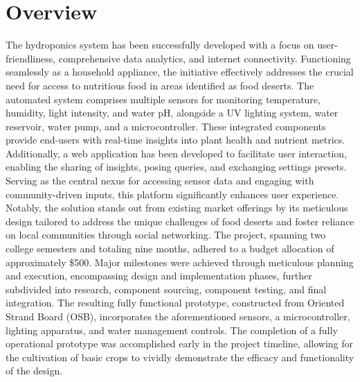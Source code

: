 \documentclass[12pt]{article}
\newcommand{\comment}[1]{} %
\begin{document}
\section*{Overview}
The hydroponics system has been successfully developed with a focus on user-friendliness, comprehensive data analytics, and internet connectivity. Functioning seamlessly as a household appliance, the initiative effectively addresses the crucial need for access to nutritious food in areas identified as food deserts. The automated system comprises multiple sensors for monitoring temperature, humidity, light intensity, and water pH, alongside a UV lighting system, water reservoir, water pump, and a microcontroller. These integrated components provide end-users with real-time insights into plant health and nutrient metrics.
\newline
\newline
\noindent Additionally, a web application has been developed to facilitate user interaction, enabling the sharing of insights, posing queries, and exchanging settings presets. Serving as the central nexus for accessing sensor data and engaging with community-driven inputs, this platform significantly enhances user experience. Notably, the solution stands out from existing market offerings by its meticulous design tailored to address the unique challenges of food deserts and foster reliance on local communities through social networking.
\newline
\newline
\noindent The project, spanning two college semesters and totaling nine months, adhered to a budget allocation of approximately \$500. Major milestones were achieved through meticulous planning and execution, encompassing design and implementation phases, further subdivided into research, component sourcing, component testing, and final integration. The resulting fully functional prototype, constructed from Oriented Strand Board (OSB), incorporates the aforementioned sensors, a microcontroller, lighting apparatus, and water management controls. The completion of a fully operational prototype was accomplished early in the project timeline, allowing for the cultivation of basic crops to vividly demonstrate the efficacy and functionality of the design.

\comment{


\section*{Dedication}
\addcontentsline{toc}{section}{Dedication}
\lipsum[1] %


}
\end{document}
